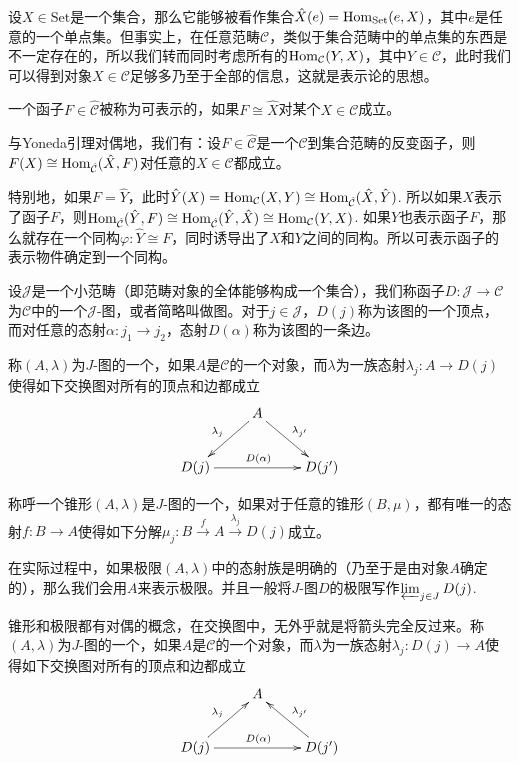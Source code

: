 \para 设$X\in\text{Set}$是一个集合，那么它能够被看作集合$\hat{X}(e)=\operatorname{Hom}_{\text{Set}}(e,X)$，其中$e$是任意的一个单点集。但事实上，在任意范畴$\mathcal{C}$，类似于集合范畴中的单点集的东西是不一定存在的，所以我们转而同时考虑所有的$\operatorname{Hom}_{\mathcal{C}}(Y,X)$，其中$Y\in \mathcal{C}$，此时我们可以得到对象$X\in \mathcal{C}$足够多乃至于全部的信息，这就是表示论的思想。

一个函子$F\in \hat{\mathcal{C}}$被称为可表示的，如果$F\cong \hat{X}$对某个$X\in \mathcal{C}$成立。

\lem 与Yoneda引理对偶地，我们有：设$F\in \hat{\mathcal{C}}$是一个$\mathcal{C}$到集合范畴的反变函子，则$F(X)\cong \operatorname{Hom}_{\hat{\mathcal{C}}} (\hat{X},F)$对任意的$X\in \mathcal{C}$都成立。

特别地，如果$F=\hat{Y}$，此时$\hat{Y}(X)=\operatorname{Hom}_{\mathcal{C}}(X,Y)\cong \operatorname{Hom}_{\hat{\mathcal{C}}}(\hat{X},\hat{Y})$. 所以如果$X$表示了函子$F$，则$\operatorname{Hom}_{\hat{\mathcal{C}}}(\hat{Y},F)\cong \operatorname{Hom}_{\hat{\mathcal{C}}}(\hat{Y},\hat{X})\cong\operatorname{Hom}_\mathcal{C}(Y,X)$. 如果$Y$也表示函子$F$，那么就存在一个同构$\varphi:\hat{Y}\cong F$，同时诱导出了$X$和$Y$之间的同构。所以可表示函子的表示物件确定到一个同构。 

\para 设$\mathcal{J}$是一个小范畴（即范畴对象的全体能够构成一个集合），我们称函子$D:\mathcal{J}\to \mathcal{C}$为$\mathcal{C}$中的一个$\mathcal{J}$-图，或者简略叫做图。对于$j\in \mathcal{J}$，$D(j)$称为该图的一个顶点，而对任意的态射$\alpha:j_1\to j_2$，态射$D(\alpha)$称为该图的一条边。

\para 称$(A,\lambda)$为$J$-图的一个，如果$A$是$\mathcal{C}$的一个对象，而$\lambda$为一族态射$\lambda_{j}:A\to D(j)$使得如下交换图对所有的顶点和边都成立
\[
	\xymatrix{
		&A \ar[dl]_{\lambda_{j}}\ar[dr]^{\lambda_{j'}}&\\
		D(j)\ar[rr]^{D(\alpha)}&&D(j')
	}
\]

称呼一个锥形$(A,\lambda)$是$J$-图的一个，如果对于任意的锥形$(B,\mu)$，都有唯一的态射$f:B\to A$使得如下分解$\mu_j:B\xrightarrow{f}A\xrightarrow{\lambda_j}D(j)$成立。

在实际过程中，如果极限$(A,\lambda)$中的态射族是明确的（乃至于是由对象$A$确定的），那么我们会用$A$来表示极限。并且一般将$J$-图$D$的极限写作$\varprojlim_{j\in J} D(j)$.

\para 锥形和极限都有对偶的概念，在交换图中，无外乎就是将箭头完全反过来。称$(A,\lambda)$为$J$-图的一个，如果$A$是$\mathcal{C}$的一个对象，而$\lambda$为一族态射$\lambda_{j}:D(j)\to A$使得如下交换图对所有的顶点和边都成立
\[
	\xymatrix{
		&A&\\
		D(j)\ar[rr]^{D(\alpha)} \ar[ur]^{\lambda_{j }}&&D(j')\ar[ul]_{\lambda_{j'}}
	}
\]

